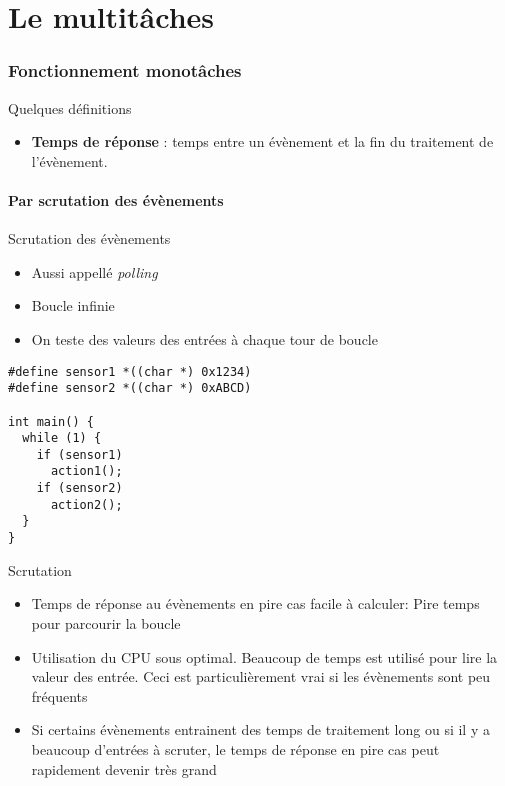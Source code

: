 
\part{Le multitâches}

\section{Fonctionnement monotâches}

\begin{frame}{Quelques définitions}
  \begin{itemize}
  \item \textbf{Temps de réponse} : temps entre un évènement et la fin
    du traitement de l'évènement.
  \end{itemize} 
\end{frame}

\subsection{Par scrutation des évènements}
\begin{frame}[fragile]{Scrutation des évènements}
  \begin{itemize} 
  \item Aussi appellé \emph{polling}
  \item Boucle infinie 
  \item On teste des valeurs des entrées à chaque tour de boucle
  \end{itemize} 
  \begin{lstlisting} 
#define sensor1 *((char *) 0x1234)
#define sensor2 *((char *) 0xABCD)

int main() {
  while (1) {
    if (sensor1)
      action1();
    if (sensor2)
      action2();
  }
}
  \end{lstlisting} 
\end{frame}

\begin{frame}{Scrutation}
  \begin{itemize} 
  \item Temps de réponse au  évènements en pire cas facile à calculer:
    Pire temps pour parcourir la boucle
  \item Utilisation du CPU sous optimal. Beaucoup de temps est utilisé
    pour lire la valeur des  entrée. Ceci est particulièrement vrai si
    les évènements sont peu fréquents
  \item Si certains évènements entrainent des temps de traitement long
    ou si il y a beaucoup  d'entrées à scruter, le temps de réponse en
    pire cas peut rapidement devenir très grand
  \end{itemize} 
\end{frame} 

